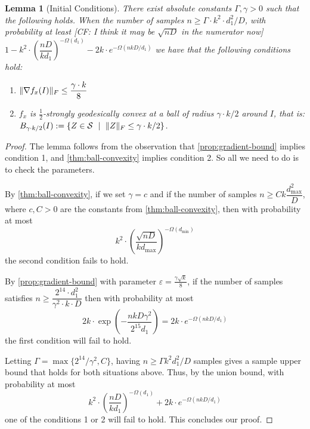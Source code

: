 \documentclass[aos]{imsart}
\newtheorem{lemma}[theorem]{Lemma}
\theoremstyle{definition}
\numberwithin{equation}{section}
\DeclarePairedDelimiter{\norm}{\lVert}{\rVert}
\newcommand{\Sym}{\mathcal{S}}
\newcommand{\smallSym}{S}
\def\dmin{d_{\min}}
\def\dmax{d_{\max}}
\newcommand{\CF}[1]{{\color{purple}[CF: #1]}}
\begin{document}
\begin{lemma}[Initial Conditions]\label{lem:tensor-initial-conditions}
	There exist absolute constants $\Gamma, \gamma > 0$ such that the following holds.
	When the number of samples $n \geq \Gamma \cdot k^2 \cdot d_1^2/D$, with probability at least \CF{I think it may be $\sqrt{nD}$ in the numerator now} $1 - k^2 \cdot \left( \dfrac{nD}{k d_1} \right)^{-\Omega(d_1)} - 2k \cdot e^{- \Omega(nkD/d_1)}$ we have that the following conditions hold:
	\begin{enumerate}
		\item $\norm{\nabla f_x(I)}_F \leq \dfrac{\gamma \cdot k}{8}$ %
		\item $f_x$ is $\frac{1}{2}$-strongly geodesically convex at a ball of radius $\gamma \cdot k/2$ around $I$, that is: $B_{\gamma \cdot k/2}(I) := \{ Z \in \Sym \ \mid \ \norm{Z}_F \leq \gamma \cdot k/2 \}$.
	\end{enumerate}
\end{lemma}

\begin{proof}
	The lemma follows from the observation that \cref{prop:gradient-bound} implies condition 1, and \cref{thm:ball-convexity} implies condition 2. So all we need to do is to check the parameters.

	By \cref{thm:ball-convexity}, if we set $\gamma = c$ and if the number of samples $n \geq C k \dfrac{d_{\max}^2}{D}$, where $c, C > 0$ are the constants from \cref{thm:ball-convexity}, then with probability at most
	$$k^2 \cdot \left( \dfrac{\sqrt{nD}}{k \dmax} \right)^{-\Omega(\dmin)}$$
	the second condition fails to hold.

	By \cref{prop:gradient-bound} with parameter $\varepsilon = \frac{\gamma \sqrt{k}}{8}$, if the number of samples satisfies $n \geq \dfrac{2^{14} \cdot d_1^2}{\gamma^2 \cdot k \cdot D}$ then with probability at most
	$$2 k \cdot \exp\left(- \frac{n k D \gamma^2}{2^{15} d_1}\right) = 2k \cdot e^{- \Omega(nkD/d_1)}$$
	the first condition will fail to hold.

	Letting $\Gamma = \max\{2^{14}/\gamma^2, C \}$, having $n \geq \Gamma k^2 d_1^2/D$ samples gives a sample upper bound that holds for both situations above.
	Thus, by the union bound, with probability at most
	$$ k^2 \cdot \left( \dfrac{nD}{k d_1} \right)^{-\Omega(d_1)} + 2k \cdot e^{- \Omega(nkD/d_1)} $$
	one of the conditions 1 or 2 will fail to hold. This concludes our proof.
\end{proof}
\end{document}
